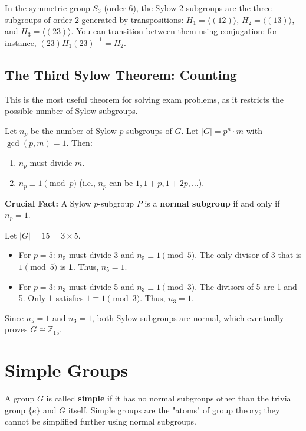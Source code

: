\begin{example}
In the symmetric group $S_3$ (order 6), the Sylow 2-subgroups are the three subgroups of order 2 generated by transpositions: $H_1 = \langle(12)\rangle$, $H_2 = \langle(13)\rangle$, and $H_3 = \langle(23)\rangle$. 
You can transition between them using conjugation: for instance, $(23)H_1(23)^{-1} = H_2$.
\end{example}

\subsection{The Third Sylow Theorem: Counting}
This is the most useful theorem for solving exam problems, as it restricts the possible number of Sylow subgroups.

\begin{theorem}
Let $n_p$ be the number of Sylow $p$-subgroups of $G$. Let $|G| = p^n \cdot m$ with $\gcd(p, m) = 1$. Then:
\begin{enumerate}
    \item $n_p$ must divide $m$.
    \item $n_p \equiv 1 \pmod{p}$ (i.e., $n_p$ can be $1, 1+p, 1+2p, \dots$).
\end{enumerate}
\textbf{Crucial Fact:} A Sylow $p$-subgroup $P$ is a \textbf{normal subgroup} if and only if $n_p = 1$.
\end{theorem}

\begin{example}
Let $|G| = 15 = 3 \times 5$. 
\begin{itemize}
    \item For $p=5$: $n_5$ must divide 3 and $n_5 \equiv 1 \pmod{5}$. The only divisor of 3 that is $1 \pmod{5}$ is \textbf{1}. Thus, $n_5=1$.
    \item For $p=3$: $n_3$ must divide 5 and $n_3 \equiv 1 \pmod{3}$. The divisors of 5 are 1 and 5. Only \textbf{1} satisfies $1 \equiv 1 \pmod{3}$. Thus, $n_3=1$.
\end{itemize}
Since $n_5=1$ and $n_3=1$, both Sylow subgroups are normal, which eventually proves $G \cong \mathbb{Z}_{15}$.
\end{example}

\section{Simple Groups}

\begin{definition}
A group $G$ is called \textbf{simple} if it has no normal subgroups other than the trivial group $\{e\}$ and $G$ itself. Simple groups are the "atoms" of group theory; they cannot be simplified further using normal subgroups.
\end{definition}

